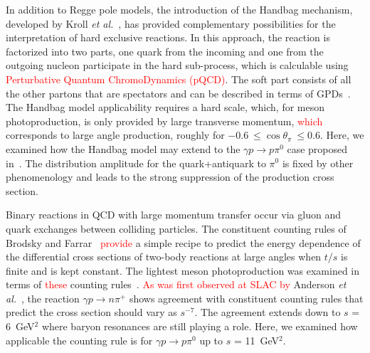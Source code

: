 \documentclass[aps,prc,twocolumn,floatfix,showpacs,preprintnumbers,amsmath,amssymb,superscriptaddress,linenumbers]{revtex4-1}
\begin{document}

 
In addition to Regge pole models, the introduction of the Handbag mechanism, developed by 
Kroll \textit{et al.}~\cite{Huang:2000kd}, has provided complementary 
possibilities for the interpretation of hard exclusive reactions. In 
this approach, the reaction is factorized into two parts, one quark 
from the incoming and one from the outgoing nucleon participate in the 
hard sub-process, which is calculable using \textcolor{red}{Perturbative Quantum ChromoDynamics (pQCD)}. The soft part 
consists of all the other partons that are spectators and can be 
described in terms of GPDs~\cite{Ji:1996nm}.
The Handbag model applicability requires a hard scale, which, for meson 
photoproduction, is only provided by large transverse momentum, \textcolor{red}{which} 
corresponds to large angle production, roughly for 
$-0.6~\leq\cos \theta_{\pi}~\leq 0.6$.  Here, we examined how the Handbag 
model may extend to the $\gamma p\rightarrow p\pi^0$ case proposed in~\cite{Huang:2000kd}. The distribution amplitude for the 
quark+antiquark to $\pi^0$ is fixed by other phenomenology and 
leads to the strong suppression of the production cross section.	



Binary reactions in QCD with large momentum transfer 
occur via gluon and quark exchanges between colliding particles. The 
constituent counting rules of Brodsky and Farrar~\cite{Brodsky:1973kr} 
\textcolor{red}{provide} a simple recipe to predict the energy dependence of the 
differential cross sections of two-body reactions at large angles 
when $t/s$ is finite and is kept constant.  The lightest meson 
photoproduction was examined in terms of \textcolor{red}{these} counting 
rules~\cite{Anderson:1976ph,Jenkins:1995bk,Zhu:2002su,Chen:2009sda,
Kong:2015yzn}. \textcolor{red}{As was first observed at SLAC by} 
Anderson \textit{et al.}~\cite{Anderson:1976ph}, the reaction $\gamma p\rightarrow n \pi^+$ 
shows agreement with constituent counting rules that predict the 
cross section should vary as $s^{-7}$. The 
agreement extends down to $s$ = 6~GeV$^2$ where baryon resonances are 
still playing a role.  Here, we examined how applicable the counting rule is 
for $\gamma p\rightarrow  p\pi^0$ up to $s$ = 11~GeV$^2$. 
\end{document}

